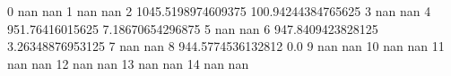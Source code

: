 0 nan nan
1 nan nan
2 1045.5198974609375 100.94244384765625
3 nan nan
4 951.76416015625 7.18670654296875
5 nan nan
6 947.8409423828125 3.26348876953125
7 nan nan
8 944.5774536132812 0.0
9 nan nan
10 nan nan
11 nan nan
12 nan nan
13 nan nan
14 nan nan
